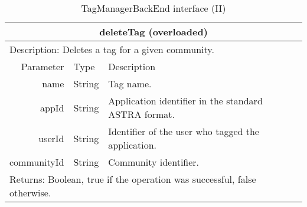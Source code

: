 \begin{table}[h!]
\begin{center}
\begin{tabular}{||r|l|l||}
		\hline \hline
		\multicolumn{3}{||c||}{\bfseries{deleteTag (overloaded)}} \\
		\hline
		\hline 
		\multicolumn{3}{||l||}{Description: Deletes a tag for a given community.} \\
		\hline \hline
			Parameter & Type & Description \\
		\hline \hline
			name & String & Tag name. \\
			appId & String & Application identifier in the standard ASTRA format. \\
			userId & String & Identifier of the user who tagged the application. \\
			communityId & String & Community identifier. \\
		\hline \hline
		\multicolumn{3}{||l||}{Returns: Boolean, true if the operation was successful,
		false otherwise.} \\ \hline \hline
		
	
		\end{tabular}
		\caption{\label{table:tmbe-interface-2} TagManagerBackEnd interface (II)}
	\end{center}
\end{table}


% 
%         
% 
% 		
